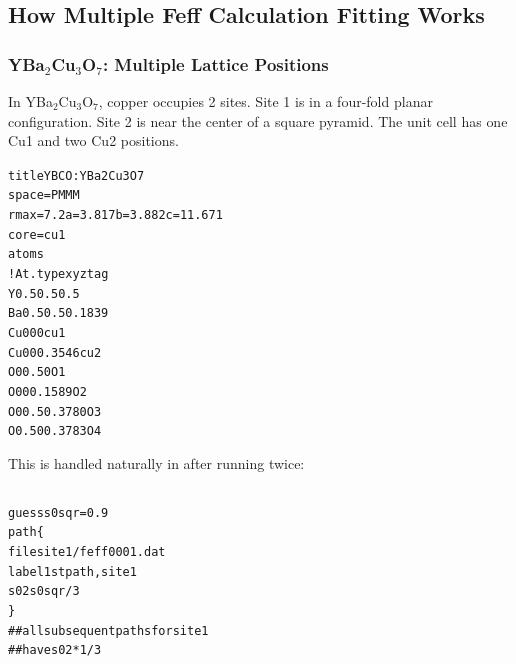 \documentclass[10pt, xcolor=x11names, compress]{beamer}
\newcommand{\ybco}{YBa$_2$Cu$_3$O$_7$}
\begin{document}
\subsection[Explain]{How Multiple Feff Calculation Fitting Works}
\begin{frame}[fragile]
  \frametitle{\ybco: Multiple Lattice Positions}

  In {\ybco}, copper occupies 2 sites.  Site 1 is in a
  {\color{Blue3}four-fold planar} configuration.  Site 2 is near the
  center of a {\color{Blue3}square pyramid}.  The unit cell has
  \alert{one} Cu1 and \alert{two} Cu2 positions.
  
  \begin{center}

    \vskip -10pt

    \begin{minipage}{0.5\linewidth}
      \begin{block}{}
        \tiny
        \begin{alltt}
{\color{Green4}title YBCO: Y Ba2 Cu3 O7}
{\color{SteelBlue4}space} = P M M M
{\color{SteelBlue4}rmax}  = 7.2   {\color{SteelBlue4}a}=3.817 {\color{SteelBlue4}b}=3.882  {\color{SteelBlue4}c}=11.671
{\color{SteelBlue4}core}  = cu1
{\color{Purple4}atoms}
{\color{Blue4}! At.type   x        y       z       tag}
   Y       0.5      0.5     0.5
   Ba      0.5      0.5     0.1839
   Cu      0        0       0        cu1
   Cu      0        0       0.3546   cu2
   O       0        0.5     0        O1
   O       0        0       0.1589   O2
   O       0        0.5     0.3780   O3
   O       0.5      0       0.3783   O4
        \end{alltt}
      \end{block}
    \end{minipage}
  \end{center}

  This is handled naturally in {\ifeffit} after running {\feff} twice:

  \vskip -8pt
  
  \begin{columns}[B]
    \begin{column}{0.5\linewidth}
      \scriptsize
      \begin{alltt}
  {\color{guessp}guess}  s0sqr = 0.9
  {\color{Purple4}path} \{
     {\color{Gold4}file}    site1/feff0001.dat
     {\color{Gold4}label}   1st path, site 1
     {\color{Gold4}s02}     s0sqr / 3
   \}
  {\color{Blue4}## all subsequent paths for site 1
  ## have} {\color{Gold4}s02}{\color{Blue4} * 1/3}
      \end{alltt}      
    \end{column}
    \begin{column}{0.5\linewidth}
      \scriptsize
      \begin{alltt}


\end{alltt}
\end{column}
\end{columns}
\end{frame}
\end{document}
